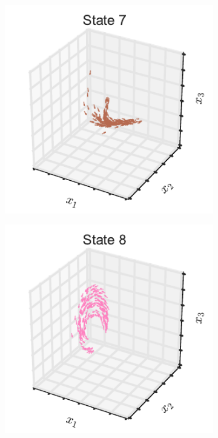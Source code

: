 \documentclass{article}
\begin{document}
\begin{figure}[th!]
\begin{subfigure}[b]{0.32\linewidth}
  \end{subfigure}
  \\
  \begin{subfigure}[b]{0.32\linewidth}
    \includegraphics[width=\textwidth]{dynamics_3d_6.pdf}
  \end{subfigure}
  \begin{subfigure}[b]{0.32\linewidth}
    \includegraphics[width=\textwidth]{dynamics_3d_7.pdf}

\end{subfigure}
\end{figure}
\end{document}
